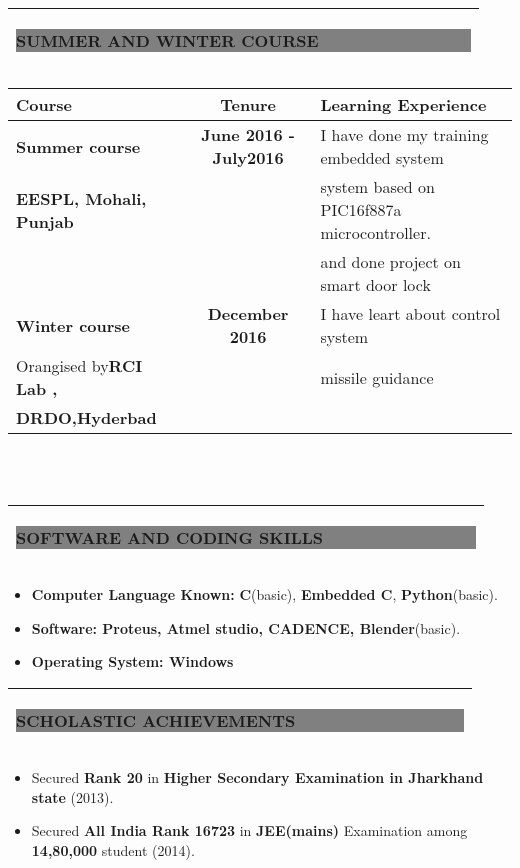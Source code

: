 \documentclass[12pt,a4paper,oneside]{letter}
\begin{document}
\begin{tabular}{|l|}
	\hline
 	\colorbox{gray}{\begin{Large}
	
\textbf{SUMMER AND WINTER COURSE $\qquad$ $\qquad $  $\qquad $  $\qquad$    }
 \end{Large}   }  \\ \hline

\end{tabular}
\begin{tabular}{|l|c|l|}
	\hline
	
	\textbf{Course } & \textbf{Tenure } & \textbf{Learning Experience }\\ \hline
	\textbf{Summer course }&\textbf{June 2016 - July2016 }& I have done my training embedded system\\
	\textbf{EESPL, Mohali, Punjab}& & system based on  PIC16f887a microcontroller.\\
	&  &and done project on smart door lock\\ \hline
	
	\textbf{Winter course }&\textbf{December 2016 }& I have leart about control system \\
	Orangised by\textbf{RCI Lab ,}& & missile guidance\\
\textbf{DRDO,Hyderbad}	&  &\\ \hline
	\end{tabular}\\\\

\begin{tabular}{|l|}
	\hline
	\colorbox{gray}{\begin{Large}
			
			\textbf{SOFTWARE AND CODING SKILLS $\qquad$ $\qquad $  $\qquad $  $\qquad$   }
	\end{Large}   }  \\ \hline
\end{tabular}
\begin{itemize}
	\item \textbf{Computer Language Known: }\textbf{C}(basic), \textbf{Embedded C}, \textbf{Python}(basic).
	\item \textbf{Software:  Proteus, Atmel studio, CADENCE, Blender}(basic).
	\item \textbf{Operating System: Windows} 
\end{itemize}
 
\begin{tabular}{|l|}
	\hline
	\colorbox{gray}{\begin{Large}
			
			\textbf{SCHOLASTIC ACHIEVEMENTS$\qquad$ $\qquad $  $\qquad $  $\qquad$ $\quad$   }
	\end{Large}   }  \\ \hline
\end{tabular}
\begin{itemize}
	\item Secured \textbf{  Rank 20} in \textbf{Higher Secondary Examination in Jharkhand state } (2013). 
	\item Secured \textbf{ All India Rank 16723} in \textbf{JEE(mains)} Examination  among \textbf{14,80,000} student (2014). 
\end{itemize}
\end{document}
